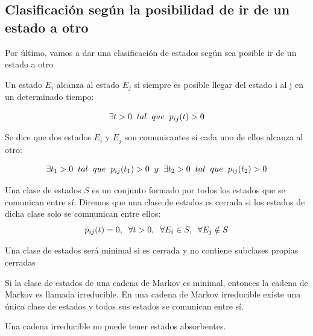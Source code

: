 \documentclass[12pt,a4paper]{article}
\begin{document}
       \subsection{Clasificación según la posibilidad de ir de un estado a otro}
  Por último, vamos a dar una clasificación de estados según sea posible ir de un estado a otro
   \begin{definition}
   	Un estado $E_{i}$ alcanza al estado $E_{j}$ si siempre es posible llegar del estado i al j en un determinado tiempo:
   	
   	\begin{equation*}
   		\exists t > 0 \hspace{0.2cm}tal \hspace{0.2cm} que \hspace{0.2cm} p_{ij}(t) > 0
   	\end{equation*}
   	
   \end{definition}
   
   \begin{definition}
   	Se dice que dos estados $E_{i}$ y $E_{j}$ son comunicantes si cada uno de ellos alcanza al otro:
   	
   	\begin{equation*}
   		\exists t_{1} > 0 \hspace{0.2cm}tal \hspace{0.2cm} que \hspace{0.2cm} p_{ij}(t_{1}) > 0 \hspace{0.2cm} y \hspace{0.2cm} \exists t_{2} > 0 \hspace{0.2cm}tal \hspace{0.2cm} que \hspace{0.2cm} p_{ij}(t_{2}) > 0
   	\end{equation*}
   \end{definition}
    \begin{definition}
   		Una clase de estados $S$ es un conjunto formado por todos los estados que se comunican entre sí. Diremos que una clase de estados es cerrada si los estados de dicha clase solo se comnunican entre ellos: $$p_{ij}(t)=0, \hspace{0.2cm} \forall t >0,\hspace{0.2cm} \forall E_{i} \in S,\hspace{0.2cm} \forall E_{j} \notin S$$
   \end{definition}
   \begin{definition}
   Una clase de estados será minimal si es cerrada y no contiene subclases propias cerradas
   \end{definition}
   \begin{definition}
   	Si la clase de estados de una cadena de Markov es minimal, entonces la cadena de Markov es llamada irreducible. 
   	En una cadena de Markov irreducible existe una única clase de estados y todos sus estados se comunican entre sí.
   \end{definition}
   \begin{prop}
   	Una cadena irreducible no puede tener estados absorbentes. 
   \end{prop}
      
\end{document}
